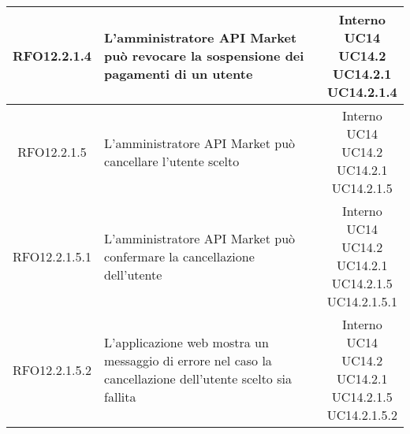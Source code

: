 \begin{longtable}{|c|p{8cm}|c|}
\hypertarget{RFO12.2.1.4}{RFO12.2.1.4} & L'amministratore API Market può revocare la sospensione dei pagamenti di un utente & \makecell*{Interno\\UC14\\UC14.2\\UC14.2.1\\UC14.2.1.4} \\
\hline

\hypertarget{RFO12.2.1.5}{RFO12.2.1.5} & L'amministratore API Market può cancellare l'utente scelto & \makecell*{Interno\\UC14\\UC14.2\\UC14.2.1\\UC14.2.1.5} \\
\hline

\hypertarget{RFO12.2.1.5.1}{RFO12.2.1.5.1} & L'amministratore API Market può confermare la cancellazione dell'utente & \makecell*{Interno\\UC14\\UC14.2\\UC14.2.1\\UC14.2.1.5\\UC14.2.1.5.1} \\
\hline

\hypertarget{RFO12.2.1.5.2}{RFO12.2.1.5.2} & L'applicazione web mostra un messaggio di errore nel caso la cancellazione dell'utente scelto sia fallita & \makecell*{Interno\\UC14\\UC14.2\\UC14.2.1\\UC14.2.1.5\\UC14.2.1.5.2} \\
\hline

\end{longtable}

